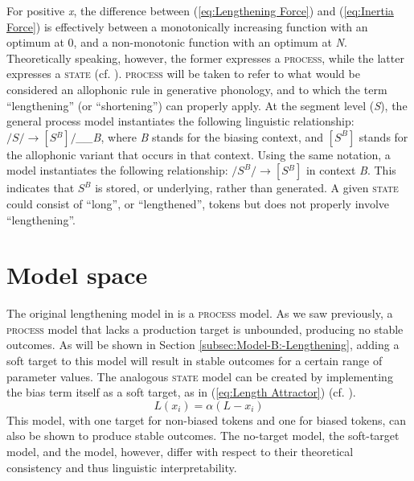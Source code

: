 For positive \emph{x}, the difference between (\ref{eq:Lengthening Force})
and (\ref{eq:Inertia Force}) is effectively between a monotonically
increasing function with an optimum at 0, and a non-monotonic function
with an optimum at \emph{N}. Theoretically speaking, however, the
former expresses a \textsc{process}, while the latter expresses a
\textsc{state} (cf. \citealt{Hyman1975}). \textsc{process }will be
taken to refer to what would be considered an allophonic rule in generative
phonology, and to which the term ``lengthening'' (or ``shortening'') can
properly apply. At the segment level (\emph{S}), the general process
model instantiates the following linguistic relationship: $/S/\rightarrow[S{}^{B}]/$\emph{\_\_B}\textsc{,
}where\emph{ B} stands for the biasing context, and $[S^{B}]$ stands
for the allophonic variant that occurs in that context. Using the
same notation, a  model instantiates the following relationship:
$/S^{B}/\rightarrow[S{}^{B}]$ in context \emph{B}. This indicates
that $S^{B}$ is stored, or underlying, rather than generated. A given
\textsc{state} could consist of ``long'', or ``lengthened'', tokens but
does not properly involve ``lengthening''. 

\section{\label{sec:Model-Interpretation}Model space}

The original lengthening model in 
is a \textsc{process} model. As we saw previously, a \textsc{process}
model that lacks a production target is unbounded, producing no stable
outcomes. As will be shown in Section \ref{subsec:Model-B:-Lengthening},
adding a soft target to this model will result in stable outcomes
for a certain range of parameter values. The analogous \textsc{state}
model can be created by implementing the bias term itself as a soft
target, as in (\ref{eq:Length Attractor}) (cf. \citealt{soskuthy2013phonetic}). 
\begin{equation}
L(x_{i})=\alpha(L-x_{i})\label{eq:Length Attractor}
\end{equation}
This model, with one target for non-biased tokens and one for biased
tokens, can also be shown to produce stable outcomes. The no-target
 model, the soft-target  model, and the
 model, however, differ with respect to their theoretical
consistency and thus linguistic interpretability. 

